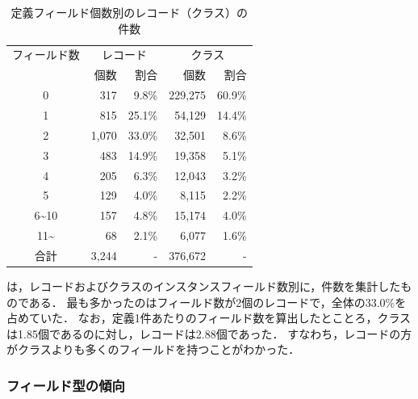 \begin{table}[t]
    \caption{定義フィールド個数別のレコード（クラス）の件数}
    \label{num_fields}
    \centering
    \begin{tabular}{c||r|r|r|r}
        \hline
        フィールド数 & \multicolumn{2}{c|}{レコード} & \multicolumn{2}{c}{クラス}\\
         & 個数 & 割合 & 個数 & 割合\\
        \hline\hline
        0 & 317 & 9.8\% & 229,275 & 60.9\%\\
        1 & 815 & 25.1\% & 54,129 & 14.4\%\\
        2 & 1,070 & 33.0\% & 32,501 & 8.6\%\\
        3 & 483 & 14.9\% & 19,358 & 5.1\%\\
        4 & 205 & 6.3\% & 12,043 & 3.2\%\\
        5 & 129 & 4.0\% & 8,115 & 2.2\%\\
        6\textasciitilde10 & 157 & 4.8\% & 15,174 & 4.0\%\\
        11\textasciitilde & 68 & 2.1\% & 6,077 & 1.6\%\\
        \hline
        合計 & 3,244 & - & 376,672 & - \\
        \hline
    \end{tabular}
\end{table}

は，レコードおよびクラスのインスタンスフィールド数別に，件数を集計したものである．
最も多かったのはフィールド数が2個のレコードで，全体の33.0\%を占めていた．
なお，定義1件あたりのフィールド数を算出したとことろ，クラスは1.85個であるのに対し，レコードは2.88個であった．
すなわち，レコードの方がクラスよりも多くのフィールドを持つことがわかった．

\subsubsection{フィールド型の傾向\label{field_type_trend}}

